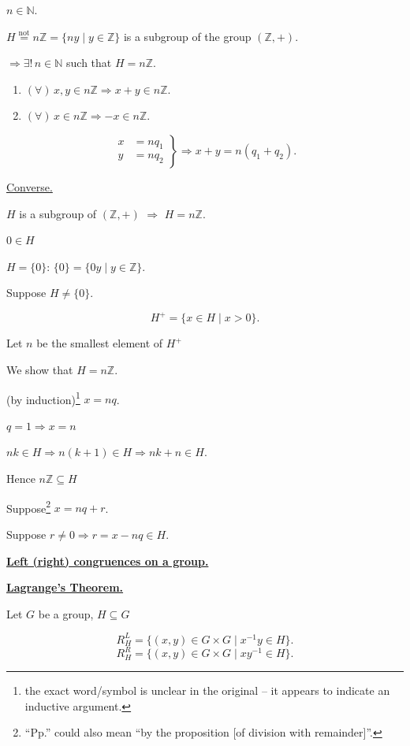 \documentclass[12pt]{article}
\begin{document}
\noindent $n\in\mathbb{N}$.

\bigskip
\noindent $H \overset{\text{not}}{=} n\mathbb{Z} = \{ny \mid y\in\mathbb{Z}\}$ is a subgroup of the group $(\mathbb{Z},+)$.

\noindent $\Rightarrow \exists!\, n\in\mathbb{N}$ such that $H=n\mathbb{Z}$.

\begin{enumerate}
\item[1)] $(\forall)\, x,y\in n\mathbb{Z} \Rightarrow x+y\in n\mathbb{Z}$.
\item[2)] $(\forall)\, x\in n\mathbb{Z} \Rightarrow -x\in n\mathbb{Z}$.
\end{enumerate}

\[
\left.\begin{aligned}
x&=nq_1\\
y&=nq_2
\end{aligned}\right\} \Rightarrow x+y = n(q_1+q_2).
\]

\bigskip
\noindent\underline{Converse.}

\noindent $H$ is a subgroup of $(\mathbb{Z},+)$ $\Rightarrow$ $H=n\mathbb{Z}$.

\noindent $0\in H$

\noindent $H=\{0\}$: \quad $\{0\} = \{0y \mid y\in\mathbb{Z}\}$.

\noindent Suppose $H\neq\{0\}$.

\[
H^+ = \{x\in H \mid x>0\}.
\]

\noindent Let $n$ be the smallest element of $H^+$

\noindent We show that $H=n\mathbb{Z}$.

\bigskip
\noindent (by induction)\footnote{the exact word/symbol is unclear in the original -- it appears to indicate an inductive argument.} $x=nq$.

\noindent $q=1 \Rightarrow x=n$

\noindent $nk\in H \Rightarrow n(k+1)\in H \Rightarrow nk+n\in H$.

\noindent Hence $n\mathbb{Z}\subseteq H$

\bigskip
\noindent Suppose\footnote{``Pp.'' could also mean ``by the proposition [of division with remainder]''.} $x=nq+r$.

\noindent Suppose $r\neq 0 \Rightarrow r=x-nq\in H$.

\bigskip
\noindent\underline{\textbf{Left (right) congruences on a group.}}

\noindent\underline{\textbf{Lagrange's Theorem.}}

\bigskip
\noindent Let $G$ be a group, $H\subseteq G$

\[
R_H^L = \{(x,y)\in G\times G \mid x^{-1}y\in H\}.
\]
\[
R_H^R = \{(x,y)\in G\times G \mid xy^{-1}\in H\}.
\]
\end{document}
